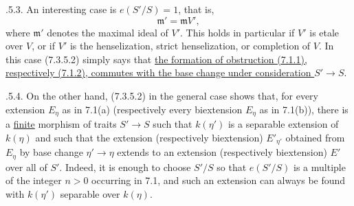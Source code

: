 \smallskip
{}.5.3.  An interesting case is $e(S'/S)=1$, that is,
\[
 \mathfrak m'=\mathfrak m V',
\]
where $\mathfrak m'$ denotes the maximal ideal of $V'$.  This holds in
particular if $V'$ is etale over $V$, or if $V'$ is the henselization,
strict henselization, or completion of $V$.  In this case (7.3.5.2) simply
says that \underline{the formation of obstruction (7.1.1), respectively
(7.1.2), commutes with the base change under consideration $S'\to S$}.

\smallskip
{}.5.4.  On the other hand, (7.3.5.2) in the general case shows
that, for every extension $E_\eta$ as in 7.1(a) (respectively every
biextension $E_\eta$ as in 7.1(b)), there is a \underline{finite} morphism
of traits $S'\to S$ such that $k(\eta')$ is a separable extension of
$k(\eta)$ and such that the extension (respectively biextension)
$E'_{\eta'}$ obtained from $E_\eta$ by base change $\eta'\to\eta$ extends
to an extension (respectively biextension) $E'$ over all of $S'$.  Indeed,
it is enough to choose $S'/S$ so that $e(S'/S)$ is a multiple of the
integer $n>0$ occurring in 7.1, and such an extension can always be found
with $k(\eta')$ separable over $k(\eta)$.
